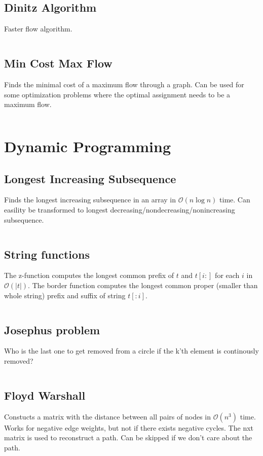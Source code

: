 \documentclass[8pt,a4paper,landscape,oneside]{amsart}
\newcommand{\codej}[1]{\inputminted[fontsize=\large,tabsize=2,baselinestretch=1]{java}{code/#1}}
\newcommand{\codep}[1]{\inputminted[fontsize=\large,tabsize=2,baselinestretch=1]{py}{code/#1}}
\newcommand{\bigO}{\mathcal{O}}
\begin{document}
\begin{multicols*}{2}
\begin{large}
    \subsection{Dinitz Algorithm}
    Faster flow algorithm.
        \codep{Graphs/dinitz.py}
    \subsection{Min Cost Max Flow}
        Finds the minimal cost of a maximum flow through a graph. 
        Can be used for some optimization problems where the optimal assignment needs to be a maximum flow.
        \codej{Graphs/MinCostMaxFlow.java}

\section{Dynamic Programming}
    \subsection{Longest Increasing Subsequence}
        Finds the longest increasing subsequence in an array in $\bigO(n \log{n})$ time. Can easility be transformed to longest decreasing/nondecreasing/nonincreasing subsequence.
        \codej{DP/lis.py}
    \subsection{String functions}
        The z-function computes the longest common prefix of $t$ and $t[i:]$ for each $i$ in $\bigO(|t|)$.
        The border function computes the longest common proper (smaller than whole string) prefix and suffix of string $t[:i]$.
        \codep{DP/strings.py}
    \subsection{Josephus problem}
        Who is the last one to get removed from a circle if the k'th element is continously removed?
        \codep{DP/josephus.py}
    \subsection{Floyd Warshall}
        Constucts a matrix with the distance between all pairs of nodes in $\bigO(n^3)$ time.
        Works for negative edge weights, but not if there exists negative cycles.
        The nxt matrix is used to reconstruct a path. Can be skipped if we don't care about the path.
        \codep{DP/floydwarshall.py}


\end{large}
\end{multicols*}
\end{document}
